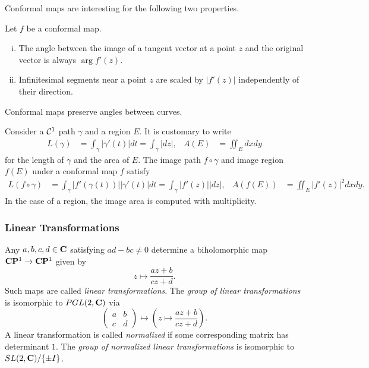 Conformal maps are interesting for the following two properties.
\begin{proposition}
  Let $f$ be a conformal map.
  \begin{enumerate}[(i)]
  \item The angle between the image of a tangent vector at a point $z$ and the original vector is always $\arg f'(z)$.
  \item Infinitesimal segments near a point $z$ are scaled by $|f'(z)|$ independently of their direction.
  \end{enumerate}
\end{proposition}

\begin{corollary}
  Conformal maps preserve angles between curves.
\end{corollary}

Consider a $\mathcal{C}^1$ path $\gamma$ and a region $E$. It is customary to write
\begin{align*}
  L(\gamma) &= \int_\gamma |\gamma'(t)| d t = \int_\gamma |d z|, &
  A(E) &= \iint_E d x d y
\end{align*}
for the length of $\gamma$ and the area of $E$. The image path $f \circ \gamma$ and image region $f(E)$ under a conformal map $f$ satisfy
\begin{align*}
  L(f \circ \gamma) &= \int_\gamma |f'(\gamma(t))| |\gamma'(t)| d t = \int_\gamma |f'(z)| |d z|, &
  A(f(E)) &= \iint_E |f'(z)|^2 d x d y.
\end{align*}
In the case of a region, the image area is computed with multiplicity.

\subsubsection{Linear Transformations}

\begin{definition}
  Any $a,b,c,d \in \mathbf{C}$ satisfying $a d - b c \neq 0$ determine a biholomorphic map $\mathbf{C}\mathbf{P}^1 \rightarrow \mathbf{C}\mathbf{P}^1$ given by
  \[
  z \mapsto \frac{a z + b}{c z + d}.
  \]
  Such maps are called \emph{linear transformations}.  The \emph{group of linear transformations} is isomorphic to $PGL(2,\mathbf{C})$ via
  \[
  \begin{pmatrix} a & b \\ c & d \end{pmatrix} \mapsto
  \left( z \mapsto \frac{a z + b}{c z + d} \right).
  \]
  A linear transformation is called \emph{normalized} if some corresponding matrix has determinant $1$. The \emph{group of normalized linear transformations} is isomorphic to $SL(2,\mathbf{C})/\{\pm I\}$.
\end{definition}

